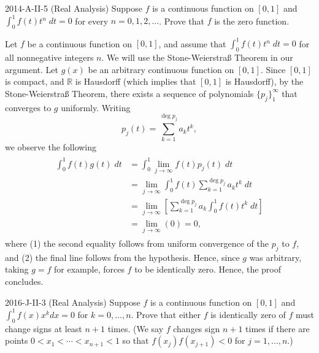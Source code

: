 \documentclass{article}
\begin{document}
\begin{prb}{2014-A-II-5 (Real Analysis)}
	Suppose $f$ is a continuous function on $[0,1]$ and $\int_{0}^{1}f(t)t^{n}\;dt = 0$ for every $n = 0, 1, 2, \ldots$. Prove that $f$ is the zero function. 
\end{prb}
\begin{solutions}
	Let $f$ be a continuous function on $[0,1]$, and assume that $\int_{0}^{1}f(t)t^{n}\;dt = 0$ for all nonnegative integers $n$. We will use the Stone-Weierstra{\ss} Theorem in our argument. Let $g(x)$ be an arbitrary continuous function on $[0,1]$. Since $[0,1]$ is compact, and $\mathbb{R}$ is Hausdorff (which implies that $[0,1]$ is Hausdorff), by the Stone-Weierstra{\ss} Theorem, there exists a sequence of polynomials $\{p_{j}\}_{1}^{\infty}$ that converges to $g$ uniformly. Writing 
		\begin{equation}
			p_{j}(t) = \sum_{k = 1}^{\deg{p_{j}}}a_{k}t^{k}, 
		\end{equation}
	we observe the following 
		\begin{align}
			\begin{split}
				\int_{0}^{1}f(t)g(t)\;dt &= \int_{0}^{1}\lim_{j \to \infty}f(t)p_{j}(t)\;dt \\
				&= \lim_{j \to \infty}\int_{0}^{1}f(t)\sum_{k = 1}^{\deg{p_{j}}}a_{k}t^{k}\;dt \\
				&= \lim_{j \to \infty}\left[\sum_{k = 1}^{\deg{p_{j}}}a_{k}\int_{0}^{1}f(t)t^{k}\;dt\right] \\
				&= \lim_{j \to \infty}(0) = 0, 
			\end{split}
		\end{align}
	where (1) the second equality follows from uniform convergence of the $p_{j}$ to $f$, and (2) the final line follows from the hypothesis. Hence, since $g$ was arbitrary, taking $g = f$ for example, forces $f$ to be identically zero. Hence, the proof concludes. 
\end{solutions}
\begin{prb}{2016-J-II-3 (Real Analysis)}
	Suppose $f$ is a continuous function on $[0,1]$ and $\int_{0}^{1}f(x)x^{k}dx = 0$ for $k =0, \ldots, n$. Prove that either $f$ is identically zero of $f$ must change signs at least $n + 1$ times. (We say $f$ changes sign $n + 1$ times if there are points $0 < x_{1} < \dotsm < x_{n + 1} < 1$ so that $f(x_{j})f(x_{j + 1}) < 0$ for $j = 1, \ldots, n$.) 
\end{prb}
\end{document}
